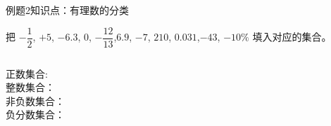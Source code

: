     \begin{frame}{例题2}{知识点：有理数的分类}
        \begin{block}{}
            把 $ -\dfrac{1}{2}$, $+5$, $-6.3$, $0$, 
        $-\dfrac{12}{13}$,$6.9$,
        $-7$, $210$, $0.031$,$-43$, $-10\%$ 填入对应的集合。
        \end{block}
        
        \begin{columns}
            正数集合: \underline{} \\
            整数集合：\underline{} \\
            非负数集合：\underline{} \\
            负分数集合：\underline{} \\

        \end{columns}
        
    \end{frame}

